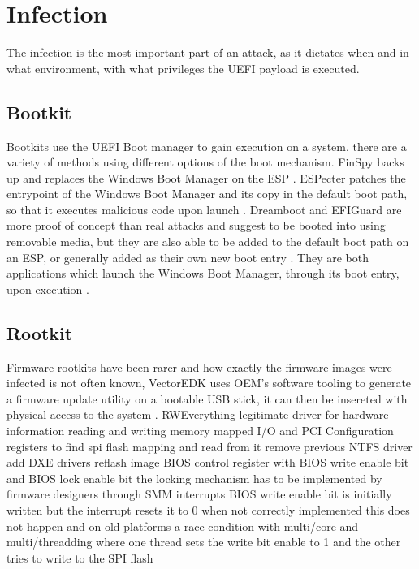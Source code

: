 \section{Infection}

The infection is the most important part of an attack, as it dictates when and in what environment, with what privileges the \ac{UEFI} payload is executed.

\subsection{Bootkit}

Bootkits use the \ac{UEFI} Boot manager to gain execution on a system, there are a variety of methods using different options of the boot mechanism.
FinSpy backs up and replaces the Windows Boot Manager  on the \ac{ESP} \cite{finspy}.
ESPecter patches the entrypoint of the Windows Boot Manager  and its copy  in the default boot path, so that it executes malicious code upon launch \cite{especter} .
Dreamboot and EFIGuard are more proof of concept than real attacks and suggest to be booted into using removable media, but they are also able to be added to the default boot path on an \ac{ESP}, or generally added as their own new boot entry \cite{efiguard}.
They are both applications which launch the Windows Boot Manager, through its boot entry, upon execution \cite{dreamboot, efiguard}.

\subsection{Rootkit}

Firmware rootkits have been rarer and how exactly the firmware images were infected is not often known,
VectorEDK uses \ac{OEM}'s software tooling to generate a firmware update utility on a bootable \ac{USB} stick, it can then be insereted with physical access to the system \cite{mosaicregressor}.
RWEverything legitimate driver for hardware information
reading and writing memory mapped \ac{I/O} and \ac{PCI} Configuration registers
to find spi flash mapping and read from it
remove previous NTFS driver
add DXE drivers
reflash image
\ac{BIOS} control register with \ac{BIOS} write enable bit and \ac{BIOS} lock enable bit
the locking mechanism has to be implemented by firmware designers through \ac{SMM} interrupts
\ac{BIOS} write enable bit is initially written but the interrupt resets it to 0
when not correctly implemented this does not happen
and on old platforms a race condition with multi\-/core and multi\-/threadding
where one thread sets the write bit enable to 1 and the other tries to write to the \ac{SPI} flash
\cite{lojax}

